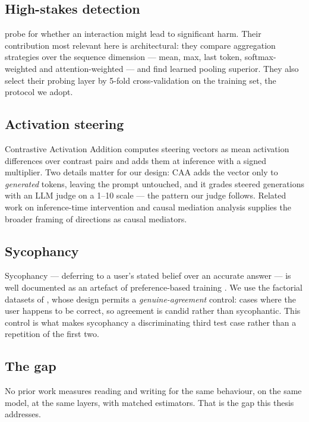 \documentclass[conference]{IEEEtran}
\begin{document}
\subsection{High-stakes detection}

\citet{mckenzie2025} probe for whether an interaction might lead to significant
harm. Their contribution most relevant here is architectural: they compare
aggregation strategies over the sequence dimension --- mean, max, last token,
softmax-weighted and attention-weighted --- and find learned pooling superior.
They also select their probing layer by 5-fold cross-validation on the training
set, the protocol we adopt.

\subsection{Activation steering}

Contrastive Activation Addition \citep{rimsky2024} computes steering vectors as
mean activation differences over contrast pairs and adds them at inference with
a signed multiplier. Two details matter for our design: CAA adds the vector only
to \emph{generated} tokens, leaving the prompt untouched, and it grades steered
generations with an LLM judge on a 1--10 scale --- the pattern our judge
follows. Related work on inference-time intervention \citep{li2023} and causal
mediation analysis \citep{vig2020,meng2022} supplies the broader framing of
directions as causal mediators.

\subsection{Sycophancy}

Sycophancy --- deferring to a user's stated belief over an accurate answer ---
is well documented as an artefact of preference-based training
\citep{perez2023,sharma2023}. We use the factorial datasets of
\citet{cincynlp2025}, whose design permits a \emph{genuine-agreement} control:
cases where the user happens to be correct, so agreement is candid rather than
sycophantic. This control is what makes sycophancy a discriminating third test
case rather than a repetition of the first two.

\subsection{The gap}

No prior work measures reading and writing for the same behaviour, on the same
model, at the same layers, with matched estimators. That is the gap this thesis
addresses.
\end{document}
